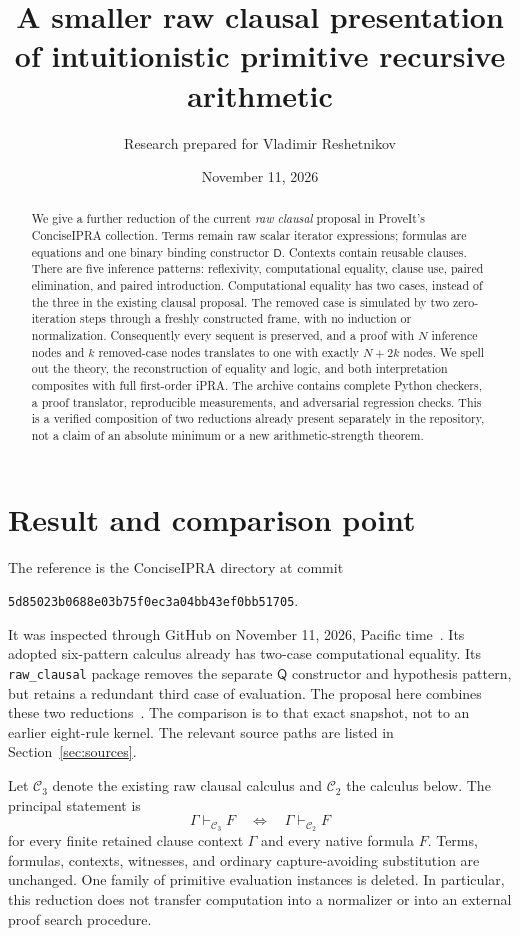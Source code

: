 \documentclass[11pt]{article}
\title{\color{ink}A smaller raw clausal presentation\protect\\of intuitionistic primitive recursive arithmetic}
\author{Research prepared for Vladimir Reshetnikov}
\date{November 11, 2026}
\theoremstyle{definition}\newtheorem{definition}[theorem]{Definition}
\newcommand{\Ctwo}{\mathcal C_2}
\newcommand{\Cthree}{\mathcal C_3}
\newcommand{\D}{\mathsf D}
\newcommand{\Q}{\mathsf Q}
\begin{document}
\maketitle
\begin{abstract}
We give a further reduction of the current \emph{raw clausal} proposal
in ProveIt's ConciseIPRA collection. Terms remain raw scalar iterator
expressions; formulas are equations and one binary binding constructor
$\D$. Contexts contain reusable clauses. There are five inference
patterns: reflexivity, computational equality, clause use, paired
elimination, and paired introduction. Computational equality has two
cases, instead of the three in the existing clausal proposal.
The removed case is simulated by two zero-iteration steps through a
freshly constructed frame, with no induction or normalization.
Consequently every sequent is preserved, and a proof with $N$ inference
nodes and $k$ removed-case nodes translates to one with exactly $N+2k$
nodes. We spell out the theory, the reconstruction of equality and
logic, and both interpretation composites with full first-order iPRA.
The archive contains complete Python checkers, a proof translator,
reproducible measurements, and adversarial regression checks.
This is a verified composition of two reductions already present
separately in the repository, not a claim of an absolute minimum or a
new arithmetic-strength theorem.
\end{abstract}

\section{Result and comparison point}

The reference is the ConciseIPRA directory at commit
\begin{center}\small\texttt{5d85023b0688e03b75f0ec3a04bb43ef0bb51705}.\end{center}
It was inspected through GitHub on November 11, 2026, Pacific time~\cite{overview}.
Its adopted six-pattern calculus already has two-case computational
equality. Its \texttt{raw\_clausal} package removes the separate
$\Q$ constructor and hypothesis pattern, but retains a redundant third
case of evaluation. The proposal here combines these two reductions~\cite{clausal,frame}.
The comparison is to that exact snapshot, not to an earlier eight-rule
kernel. The relevant source paths are listed in Section~\ref{sec:sources}.

Let $\Cthree$ denote the existing raw clausal calculus and $\Ctwo$
the calculus below. The principal statement is
\[
       \Gamma\vdash_{\Cthree}F
       \quad\Longleftrightarrow\quad
       \Gamma\vdash_{\Ctwo}F
\]
for every finite retained clause context $\Gamma$ and every native
formula $F$. Terms, formulas, contexts, witnesses, and ordinary
capture-avoiding substitution are unchanged. One family of primitive
evaluation instances is deleted. In particular, this reduction does
not transfer computation into a normalizer or into an external
proof search procedure.
\end{document}
